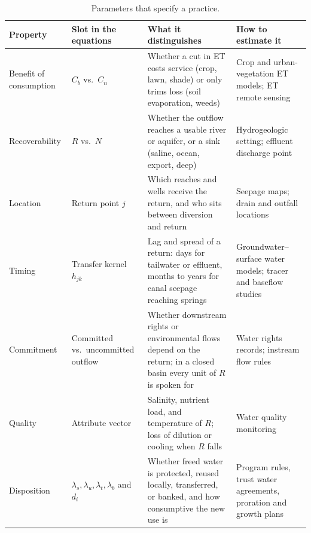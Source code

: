 \documentclass[11pt]{article}
\newcommand{\Cb}{C_b}                       %
\newcommand{\Cn}{C_n}                       %
\begin{document}
\begin{table}[htbp]
\centering
\caption{Parameters that specify a practice.}\label{tab:parameters}
\footnotesize
\begin{tabularx}{\textwidth}{@{}P{2.2cm}P{2.6cm}LL@{}}
\toprule
Property & Slot in the equations & What it distinguishes & How to estimate it \\
\midrule
Benefit of consumption & $\Cb$ vs.\ $\Cn$ & Whether a cut in ET costs service (crop, lawn, shade) or only trims loss (soil evaporation, weeds) & Crop and urban-vegetation ET models; ET remote sensing \\
Recoverability & $R$ vs.\ $N$ & Whether the outflow reaches a usable river or aquifer, or a sink (saline, ocean, export, deep) & Hydrogeologic setting; effluent discharge point \\
Location & Return point $j$ & Which reaches and wells receive the return, and who sits between diversion and return & Seepage maps; drain and outfall locations \\
Timing & Transfer kernel $h_{jk}$ & Lag and spread of a return: days for tailwater or effluent, months to years for canal seepage reaching springs & Groundwater--surface water models; tracer and baseflow studies \\
Commitment & Committed vs.\ uncommitted outflow \citep{molden1997} & Whether downstream rights or environmental flows depend on the return; in a closed basin every unit of $R$ is spoken for & Water rights records; instream flow rules \\
Quality & Attribute vector & Salinity, nutrient load, and temperature of $R$; loss of dilution or cooling when $R$ falls & Water quality monitoring \\
Disposition & $\lambda_s,\lambda_u,\lambda_t,\lambda_b$ and $d_i$ & Whether freed water is protected, reused locally, transferred, or banked, and how consumptive the new use is & Program rules, trust water agreements, proration and growth plans \\
\bottomrule
\end{tabularx}
\end{table}
\end{document}
